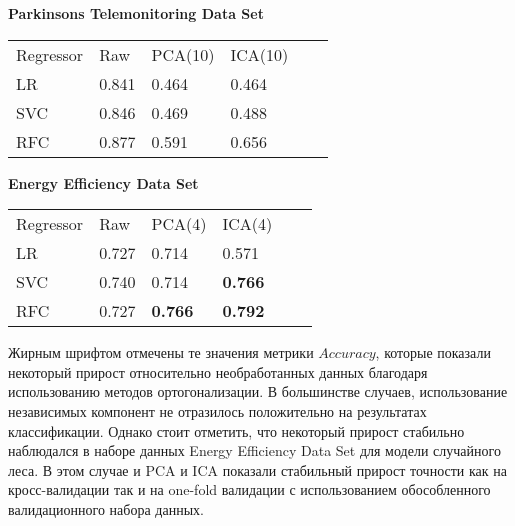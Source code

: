 \documentclass[runningheads]{llncs}
\begin{document}
\textbf{Parkinsons Telemonitoring Data Set}
\begin{table}[H]
\begin{tabular}{llllll}
Regressor & Raw   & PCA(10) & ICA(10)\\
LR  & 0.841  & 0.464  & 0.464 \\
SVC & 0.846  & 0.469   & 0.488 \\
RFC & 0.877  & 0.591  & 0.656 
\end{tabular}
\end{table}

\textbf{Energy Efficiency Data Set}
\begin{table}[H]
\begin{tabular}{llllll}
Regressor & Raw  & PCA(4) & ICA(4) \\
LR  & 0.727 & 0.714  & 0.571 \\
SVC & 0.740 & 0.714  & \textbf{0.766} \\
RFC & 0.727 & \textbf{0.766}  & \textbf{0.792}
\end{tabular}
\end{table}

Жирным шрифтом отмечены те значения метрики $Accuracy$, которые показали некоторый прирост относительно необработанных данных благодаря использованию методов ортогонализации. В большинстве случаев, использование независимых компонент не отразилось положительно на результатах классификации. Однако стоит отметить, что некоторый прирост стабильно наблюдался в наборе данных Energy Efficiency Data Set для модели случайного леса. В этом случае и PCA и ICA показали стабильный прирост точности как на кросс-валидации так и на one-fold валидации с использованием обособленного валидационного набора данных.
\end{document}
